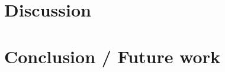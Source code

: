 \documentclass[10pt,journal,compsoc]{IEEEtran}
\begin{document}
\section{Discussion}

\section{Conclusion / Future work}



\end{document}
